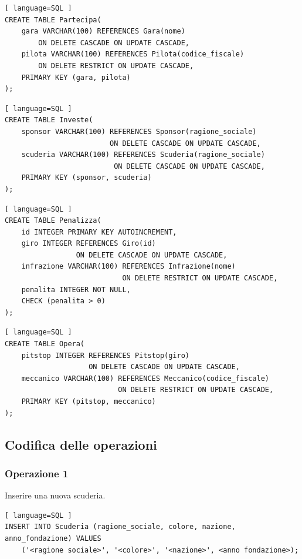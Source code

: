 \documentclass[11pt]{article}
\begin{document}
\begin{lstlisting}[ language=SQL ]
CREATE TABLE Partecipa(
    gara VARCHAR(100) REFERENCES Gara(nome) 
        ON DELETE CASCADE ON UPDATE CASCADE,
    pilota VARCHAR(100) REFERENCES Pilota(codice_fiscale) 
        ON DELETE RESTRICT ON UPDATE CASCADE,
    PRIMARY KEY (gara, pilota)
);
\end{lstlisting}

\begin{lstlisting}[ language=SQL ]
CREATE TABLE Investe(
    sponsor VARCHAR(100) REFERENCES Sponsor(ragione_sociale) 
                         ON DELETE CASCADE ON UPDATE CASCADE,
    scuderia VARCHAR(100) REFERENCES Scuderia(ragione_sociale) 
                          ON DELETE CASCADE ON UPDATE CASCADE,
    PRIMARY KEY (sponsor, scuderia)
);
\end{lstlisting}

\newpage
\begin{lstlisting}[ language=SQL ]
CREATE TABLE Penalizza(
    id INTEGER PRIMARY KEY AUTOINCREMENT,
    giro INTEGER REFERENCES Giro(id) 
                 ON DELETE CASCADE ON UPDATE CASCADE,
    infrazione VARCHAR(100) REFERENCES Infrazione(nome) 
                            ON DELETE RESTRICT ON UPDATE CASCADE,
    penalita INTEGER NOT NULL,
    CHECK (penalita > 0)
);
\end{lstlisting}

\begin{lstlisting}[ language=SQL ]
CREATE TABLE Opera(
    pitstop INTEGER REFERENCES Pitstop(giro) 
                    ON DELETE CASCADE ON UPDATE CASCADE,
    meccanico VARCHAR(100) REFERENCES Meccanico(codice_fiscale) 
                           ON DELETE RESTRICT ON UPDATE CASCADE,
    PRIMARY KEY (pitstop, meccanico)
);
\end{lstlisting}



\subsection{Codifica delle operazioni}

\subsubsection{Operazione 1}
Inserire una nuova scuderia.
\begin{lstlisting}[ language=SQL ]
INSERT INTO Scuderia (ragione_sociale, colore, nazione, anno_fondazione) VALUES
    ('<ragione sociale>', '<colore>', '<nazione>', <anno fondazione>);
\end{lstlisting}
\end{document}

